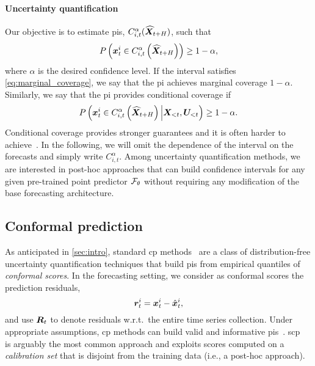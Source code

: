 \paragraph{Uncertainty quantification} Our objective is to estimate \glspl{pi}, $ C^\alpha_{i,t}(\widehat {{\bm{X}}}_{t+H})$, such that
\begin{equation}\label{eq:marginal_coverage}
    P\left({\bm{x}}^i_{t} \in C^\alpha_{i,t}\left(\widehat {{\bm{X}}}_{t+H} \right)\right) \geq 1- \alpha,
\end{equation}
where $\alpha$ is the desired confidence level. If the interval satisfies \autoref{eq:marginal_coverage}, we say that the \gls{pi} achieves marginal coverage $1-\alpha$. Similarly, we say that the \gls{pi} provides conditional coverage if
\begin{equation}\label{eq:conditional_coverage}
    P\left({\bm{x}}^i_{t} \in C^\alpha_{i,t}\left(\widehat {{\bm{X}}}_{t+H} \right) \Big| {\bm{X}}_{<t}, {\bm{U}}_{<t} \right) \geq 1- \alpha.
\end{equation}
Conditional coverage provides stronger guarantees and it is often harder to achieve~\cite{angelopoulos2024theoretical}. In the following, we will omit the dependence of the interval on the forecasts and simply write $C^\alpha_{i,t}$. Among uncertainty quantification methods, we are interested in post-hoc approaches that can build confidence intervals for any given pre-trained point predictor ${\mathcal{F}}_\theta$ without requiring any modification of the base forecasting architecture.

\subsection{Conformal prediction}\label{sec:cp}

As anticipated in \autoref{sec:intro}, standard \Gls{cp} methods~\cite{vovk2005algorithmic, angelopoulos2023conformal} are a class of distribution-free uncertainty quantification techniques that build \glspl{pi} from empirical quantiles of \textit{conformal scores}. In the forecasting setting, we consider as conformal scores the prediction residuals,
\begin{equation}\label{eq:residual}
    {\bm{r}}^i_t = {\bm{x}}^i_t - \hat {{\bm{x}}}^i_t,
\end{equation}
and use ${\bm{R}}_t$ to denote residuals w.r.t.\ the entire time series collection. Under appropriate assumptions, \gls{cp} methods can build valid and informative \glspl{pi}~\cite{angelopoulos2023conformal, barber2023conformal}. \Gls{scp}~\cite{vovk2005algorithmic} is arguably the most common approach and exploits scores computed on a \textit{calibration set} that is disjoint from the training data (i.e., a post-hoc approach). 

